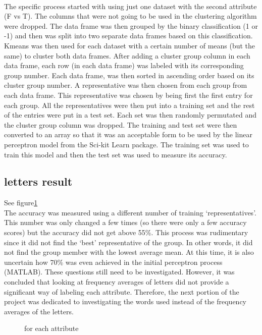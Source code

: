 \documentclass{article}
\begin{document}
\\
The specific process started with using just one dataset with the second attribute (F vs T). The columns that were not going to be used in the clustering algorithm were dropped. The data frame was then grouped by the binary classification (1 or -1) and then was split into two separate data frames based on this classification. 
\\
Kmeans was then used for each dataset with a certain number of means (but the same) to cluster both data frames. After adding a cluster group column in each data frame, each row (in each data frame) was labeled with its corresponding group number. Each data frame, was then sorted in ascending order based on its cluster group number. A representative was then chosen from each group from each data frame. This representative was chosen by being first the first entry for each group. All the representatives were then put into a training set and the rest of the entries were put in a test set. Each set was then randomly permutated and the cluster group column was dropped. The training and test set were then converted to an array so that it was an acceptable form to be used by the linear perceptron model from the Sci-kit Learn package. The training set was used to train this model and then the test set was used to measure its accuracy.

\subsection{letters result}
See figure\ref{fig:letter}\\
The accuracy was measured using a different number of training ‘representatives’. This number was only changed a few times (so there were only a few accuracy scores) but the accuracy did not get above 55\%. This process was rudimentary since it did not find the ‘best’ representative of the group. In other words, it did not find the group member with the lowest average mean. At this time, it is also uncertain how 70\% was even achieved in the initial perceptron process (MATLAB). These questions still need to be investigated. However, it was concluded that looking at frequency averages of letters did not provide a significant way of labeling each attribute. Therefore, the next portion of the project was dedicated to investigating the words used instead of the frequency averages of the letters.

\begin{figure}
  
  \centering
  \caption{ for each attribute}
  \label{fig:letter}
\end{figure} 
\end{document}
